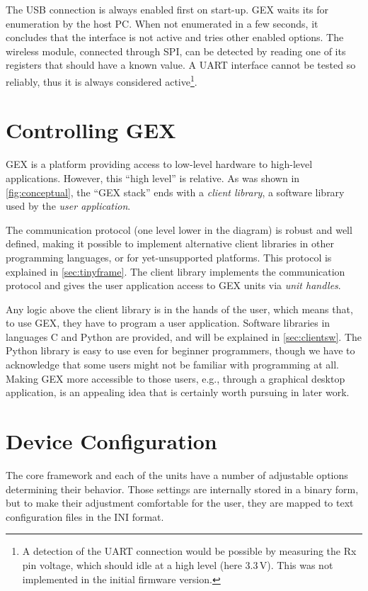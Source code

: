 The \gls{USB} connection is always enabled first on start-up. GEX waits its for enumeration by the host \gls{PC}. When not enumerated in a few seconds, it concludes that the interface is not active and tries other enabled options. The wireless module, connected through \gls{SPI}, can be detected by reading one of its registers that should have a known value. A \gls{UART} interface cannot be tested so reliably, thus it is always considered active\footnote{A detection of the UART connection would be possible by measuring the Rx pin voltage, which should idle at a high level (here 3.3\,V). This was not implemented in the initial firmware version.}.

\section{Controlling GEX}

GEX is a platform providing access to low-level hardware to high-level applications. However, this ``high level'' is relative. As was shown in \cref{fig:conceptual}, the ``GEX stack'' ends with a \textit{client library}, a software library used by the \textit{user application}.

The communication protocol (one level lower in the diagram) is robust and well defined, making it possible to implement alternative client libraries in other programming languages, or for yet-unsupported platforms. This protocol is explained in \cref{sec:tinyframe}. The client library implements the communication protocol and gives the user application access to GEX units via \textit{unit handles}. 

Any logic above the client library is in the hands of the user, which means that, to use GEX, they have to program a user application. Software libraries in languages C and Python are provided, and will be explained in \cref{sec:clientsw}. The Python library is easy to use even for beginner programmers, though we have to acknowledge that some users might not be familiar with programming at all. Making GEX more accessible to those users, e.g., through a graphical desktop application, is an appealing idea that is certainly worth pursuing in later work.

\section{Device Configuration}

The core framework and each of the units have a number of adjustable options determining their behavior. Those settings are internally stored in a binary form, but to make their adjustment comfortable for the user, they are mapped to text configuration files in the INI format.

